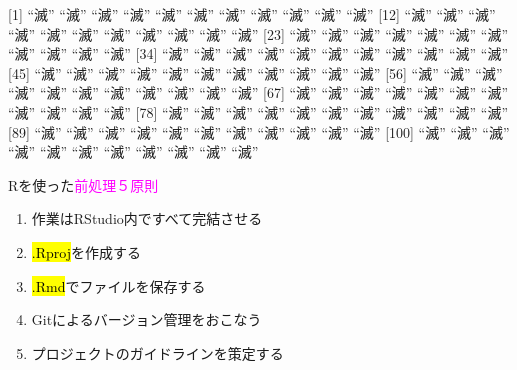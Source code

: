 \documentclass[ignorenonframetext,]{beamer}
\begin{document}
\begin{frame}

{[}1{]} ``滅'' ``滅'' ``滅'' ``滅'' ``滅'' ``滅'' ``滅'' ``滅'' ``滅''
``滅'' ``滅'' {[}12{]} ``滅'' ``滅'' ``滅'' ``滅'' ``滅'' ``滅'' ``滅''
``滅'' ``滅'' ``滅'' ``滅'' {[}23{]} ``滅'' ``滅'' ``滅'' ``滅'' ``滅''
``滅'' ``滅'' ``滅'' ``滅'' ``滅'' ``滅'' {[}34{]} ``滅'' ``滅'' ``滅''
``滅'' ``滅'' ``滅'' ``滅'' ``滅'' ``滅'' ``滅'' ``滅'' {[}45{]} ``滅''
``滅'' ``滅'' ``滅'' ``滅'' ``滅'' ``滅'' ``滅'' ``滅'' ``滅'' ``滅''
{[}56{]} ``滅'' ``滅'' ``滅'' ``滅'' ``滅'' ``滅'' ``滅'' ``滅'' ``滅''
``滅'' ``滅'' {[}67{]} ``滅'' ``滅'' ``滅'' ``滅'' ``滅'' ``滅'' ``滅''
``滅'' ``滅'' ``滅'' ``滅'' {[}78{]} ``滅'' ``滅'' ``滅'' ``滅'' ``滅''
``滅'' ``滅'' ``滅'' ``滅'' ``滅'' ``滅'' {[}89{]} ``滅'' ``滅'' ``滅''
``滅'' ``滅'' ``滅'' ``滅'' ``滅'' ``滅'' ``滅'' ``滅'' {[}100{]} ``滅''
``滅'' ``滅'' ``滅'' ``滅'' ``滅'' ``滅'' ``滅'' ``滅'' ``滅'' ``滅''

\end{frame}

\begin{frame}{\faBullhorn Rを使った\textcolor{magenta}{前処理５原則}}

\begin{enumerate}
\def\labelenumi{\arabic{enumi}.}
\itemsep1pt\parskip0pt
\item
  作業はRStudio内ですべて完結させる
\item
  \hl{.Rproj}を作成する
\item
  \hl{.Rmd}でファイルを保存する
\item
  Gitによるバージョン管理をおこなう
\item
  プロジェクトのガイドラインを策定する
\end{enumerate}

\end{frame}
\end{document}
